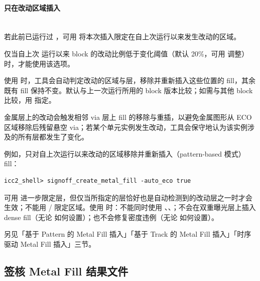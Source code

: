 \paragraph{只在改动区域插入}
\hfill\\
若此前已运行过 ，可用  将本次插入限定在自上次运行以来发生改动的区域。

\begin{noteBox}
仅当自上次  运行以来 block 的改动比例低于变化阈值（默认 20\%，可用  调整）时，才能使用该选项。
\end{noteBox}

使用  时，工具会自动判定改动的区域与层，移除并重新插入这些位置的 fill，其余既有 fill 保持不变。默认与上一次运行所用的 block 版本比较；如需与其他 block 比较，用  指定。

\begin{noteBox}
金属层上的改动会触发相邻 via 层上 fill 的移除与重插，以避免金属图形从 ECO 区域移除后残留悬空 via；若某个单元实例发生改动，工具会保守地认为该实例涉及的所有层都发生了变化。
\end{noteBox}

例如，只对自上次运行以来改动的区域移除并重新插入（pattern-based 模式）fill：

\begin{lstlisting}
icc2_shell> signoff_create_metal_fill -auto_eco true
\end{lstlisting}

可用  进一步限定层，但仅当所指定的层恰好也是自动检测到的改动层之一时才会生效；不能用 / 限定区域。使用  时：不能同时使用 、、；不会在双重曝光层上插入 dense fill（无论  如何设置）；也不会修复密度违例（无论  如何设置）。

\begin{seeAlsoBox}
另见「基于 Pattern 的 Metal Fill 插入」「基于 Track 的 Metal Fill 插入」「时序驱动 Metal Fill 插入」三节。
\end{seeAlsoBox}

\subsection{签核 Metal Fill 结果文件}
